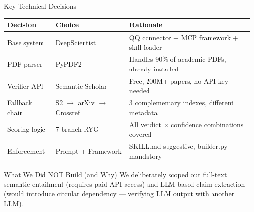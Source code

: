\documentclass[aspectratio=169,11pt]{beamer}
\begin{document}
\begin{frame}{Key Technical Decisions}
  \begin{table}[h]
    \footnotesize
    \begin{tabular}{lp{2.2cm}p{6.5cm}}
      \toprule
      Decision & Choice & Rationale \\
      \midrule
      Base system & DeepScientist & QQ connector + MCP framework + skill loader \\
      PDF parser & PyPDF2 & Handles 90\% of academic PDFs, already installed \\
      Verifier API & Semantic Scholar & Free, 200M+ papers, no API key needed \\
      Fallback chain & S2 $\to$ arXiv $\to$ Crossref & 3 complementary indexes, different metadata \\
      Scoring logic & 7-branch RYG & All verdict $\times$ confidence combinations covered \\
      Enforcement & Prompt + Framework & SKILL.md suggestive, builder.py mandatory \\
      \bottomrule
    \end{tabular}
  \end{table}

  \begin{block}{What We Did NOT Build (and Why)}
    \footnotesize
    We deliberately scoped out full-text semantic entailment (requires paid API access) and LLM-based claim extraction (would introduce circular dependency --- verifying LLM output with another LLM).
  \end{block}
\end{frame}
\end{document}
